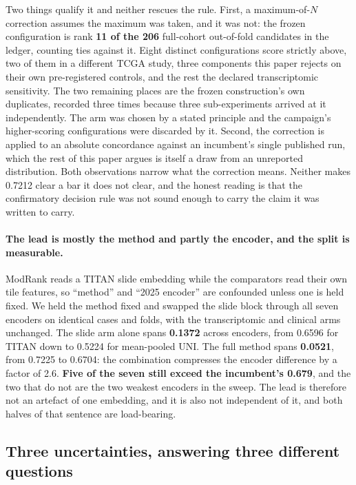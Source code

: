 \documentclass[11pt]{article}
\begin{document}
Two things qualify it and neither rescues the rule. First, a maximum-of-$N$ correction assumes the
maximum was taken, and it was not: the frozen configuration is rank \textbf{11 of the 206}
full-cohort out-of-fold candidates in the ledger, counting ties against it. Eight distinct
configurations score strictly above, two of them in a different TCGA study, three components this
paper rejects on their own pre-registered controls, and the rest the declared transcriptomic
sensitivity. The two remaining places are the frozen construction's own duplicates, recorded three
times because three sub-experiments arrived at it independently. The arm was chosen by a stated
principle and the campaign's higher-scoring configurations were discarded by it. Second, the correction is applied to
an absolute concordance against an incumbent's single published run, which the rest of this paper
argues is itself a draw from an unreported distribution. Both observations narrow what the
correction means. Neither makes 0.7212 clear a bar it does not clear, and the honest reading is
that the confirmatory decision rule was not sound enough to carry the claim it was written to
carry.

\paragraph{The lead is mostly the method and partly the encoder, and the split is measurable.}
ModRank reads a TITAN slide embedding while the comparators read their own tile features, so
``method'' and ``2025 encoder'' are confounded unless one is held fixed. We held the method fixed
and swapped the slide block through all seven encoders on identical cases and folds, with the
transcriptomic and clinical arms unchanged. The slide arm alone spans \textbf{0.1372} across
encoders, from 0.6596 for TITAN down to 0.5224 for mean-pooled UNI. The full method spans
\textbf{0.0521}, from 0.7225 to 0.6704: the combination compresses the encoder difference by a
factor of 2.6. \textbf{Five of the seven still exceed the incumbent's 0.679}, and the two that do
not are the two weakest encoders in the sweep. The lead is therefore not an artefact of one
embedding, and it is also not independent of it, and both halves of that sentence are load-bearing.

\subsection{Three uncertainties, answering three different questions}
\label{sec:uncertainty}
\end{document}
